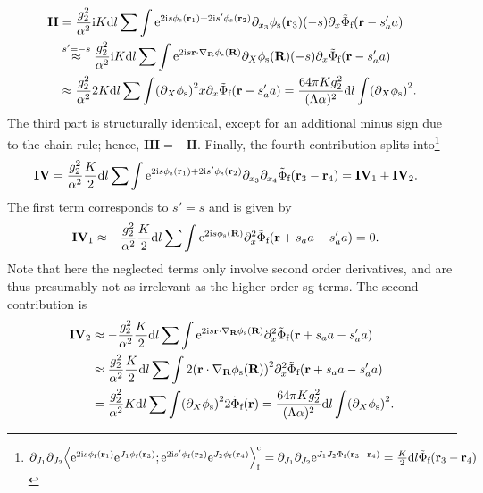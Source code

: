 \begin{align*}
\textbf{II} &= \frac{g_2^2}{\alpha^2} \i K \d l \sum \int \powe{2\i s\phi_\s(\textbf{r}_1) + 2\i s'\phi_\s(\textbf{r}_2)} \partial_{x_3} \phi_\s(\textbf{r}_3) (-s) \partial_x \tilde{\Phi}_\f(\textbf{r} - s_a'a)\\
&\overset{s'=-s}{\approx} \frac{g_2^2}{\alpha^2} \i K \d l \sum \int \powe{2\i s \textbf{r}\cdot \nabla_\textbf{R} \phi_\s(\textbf{R})} \partial_X\phi_\s(\textbf{R}) (-s) \partial_x\tilde{\Phi}_\f(\textbf{r}-s_a'a)\\
&\approx \frac{g_2^2}{\alpha^2} 2K\d l \sum \int \kla*{\partial_X\phi_\s}^2 x \partial_x\tilde{\Phi}_\f(\textbf{r}-s_a'a) = \frac{64\pi Kg_2^2}{(\Lambda\alpha)^2} \d l \int \kla*{\partial_X\phi_\s}^2.
\end{align*}
The third part is structurally identical, except for an additional minus sign due to the chain rule; hence, $\textbf{III} = -\textbf{II}$.
Finally, the fourth contribution splits into\footnote{$\partial_{J_1} \partial_{J_2} \bra*{\powe{2\i s\phi_\f(\textbf{r}_1)} \powe{J_1\phi_\f(\textbf{r}_3)}; \powe{2\i s' \phi_\f(\textbf{r}_2)} \powe{J_2\phi_\f(\textbf{r}_4)}}_\f^\c = \partial_{J_1} \partial_{J_2} \powe{J_1J_2 \Phi_\f(\textbf{r}_3 - \textbf{r}_4)} = \frac{K}{2} \d l \tilde{\Phi}_\f (\textbf{r}_3 - \textbf{r}_4)$}
\begin{align*}
\textbf{IV} &= \frac{g_2^2}{\alpha^2} \frac{K}{2} \text{d} l \sum \int \text{e}^{2\text{i} s\phi_{\text{s}}(\textbf{r}_1) + 2\text{i} s'\phi_{\text{s}} (\textbf{r}_2)} \partial_{x_3} \partial_{x_4}\tilde{\Phi}_{\text{f}} (\textbf{r}_3 - \textbf{r}_4) = \textbf{IV}_1 + \textbf{IV}_2.
\end{align*}
The first term corresponds to $s'=s$ and is given by
\begin{align*}
\textbf{IV}_1 &\approx -\frac{g_2^2}{\alpha^2} \frac{K}{2} \text{d} l \sum \int \text{e}^{2\text{i} s \phi_{\text{s}}(\textbf{R})} \partial_{x}^2 \tilde{\Phi}_{\text{f}} (\textbf{r} + s_aa-s_a'a) = 0.
\end{align*}
Note that here the neglected terms only involve second order derivatives, and are thus presumably not as irrelevant as the higher order \gls{sg}-terms.
The second contribution is
\begin{align*}
\textbf{IV}_2 &\approx - \frac{g_2^2}{\alpha^2} \frac{K}{2} \d l \sum \int \powe{2\i s\textbf{r}\cdot \nabla_\textbf{R}\phi_\s(\textbf{R})} \partial_x^2\tilde{\Phi}_\f(\textbf{r} + s_aa-s_a'a)\\
&\approx \frac{g_2^2}{\alpha^2} \frac{K}{2} \d l \sum \int 2\kla*{\textbf{r}\cdot \nabla_\textbf{R}\phi_\s(\textbf{R})}^2 \partial_x^2\tilde{\Phi}_\f(\textbf{r} + s_aa-s_a'a)\\
&= \frac{g_2^2}{\alpha^2} K\d l \sum \int \kla*{\partial_X\phi_\s}^2 2 \tilde{\Phi}_\f(\textbf{r}) = \frac{64\pi Kg_2^2}{(\Lambda\alpha)^2} \d l \int \kla*{\partial_X \phi_\s}^2.
\end{align*}
